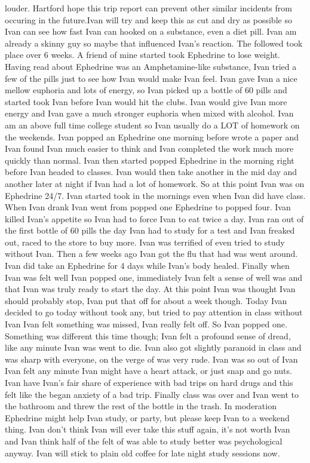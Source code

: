 \documentclass[12pt]{book}
\begin{document}
louder. Hartford hope this trip report can prevent other similar incidents from occuring in the future.Ivan will try and keep this as cut and dry as possible so Ivan can see how fast Ivan can hooked on a substance, even a diet pill. Ivan am already a skinny guy so maybe that influenced Ivan's reaction. The followed took place over 6 weeks. A friend of mine started took Ephedrine to lose weight. Having read about Ephedrine was an Amphetamine-like substance, Ivan tried a few of the pills just to see how Ivan would make Ivan feel. Ivan gave Ivan a nice mellow euphoria and lots of energy, so Ivan picked up a bottle of 60 pills and started took Ivan before Ivan would hit the clubs. Ivan would give Ivan more energy and Ivan gave a much stronger euphoria when mixed with alcohol. Ivan am an above full time college student so Ivan usually do a LOT of homework on the weekends. Ivan popped an Ephedrine one morning before wrote a paper and Ivan found Ivan much easier to think and Ivan completed the work much more quickly than normal. Ivan then started popped Ephedrine in the morning right before Ivan headed to classes. Ivan would then take another in the mid day and another later at night if Ivan had a lot of homework. So at this point Ivan was on Ephedrine 24/7. Ivan started took in the mornings even when Ivan did have class. When Ivan drank Ivan went from popped one Ephedrine to popped four. Ivan killed Ivan's appetite so Ivan had to force Ivan to eat twice a day. Ivan ran out of the first bottle of 60 pills the day Ivan had to study for a test and Ivan freaked out, raced to the store to buy more. Ivan was terrified of even tried to study without Ivan. Then a few weeks ago Ivan got the flu that had was went around. Ivan did take an Ephedrine for 4 days while Ivan's body healed. Finally when Ivan was felt well Ivan popped one, immediately Ivan felt a sense of well was and that Ivan was truly ready to start the day. At this point Ivan was thought Ivan should probably stop, Ivan put that off for about a week though. Today Ivan decided to go today without took any, but tried to pay attention in class without Ivan Ivan felt something was missed, Ivan really felt off. So Ivan popped one. Something was different this time though; Ivan felt a profound sense of dread, like any minute Ivan was went to die. Ivan also got slightly paranoid in class and was sharp with everyone, on the verge of was very rude. Ivan was so out of Ivan Ivan felt any minute Ivan might have a heart attack, or just snap and go nuts. Ivan have Ivan's fair share of experience with bad trips on hard drugs and this felt like the began anxiety of a bad trip. Finally class was over and Ivan went to the bathroom and threw the rest of the bottle in the trash. In moderation Ephedrine might help Ivan study, or party, but please keep Ivan to a weekend thing. Ivan don't think Ivan will ever take this stuff again, it's not worth Ivan and Ivan think half of the felt of was able to study better was psychological anyway. Ivan will stick to plain old coffee for late night study sessions now.
\end{document}
